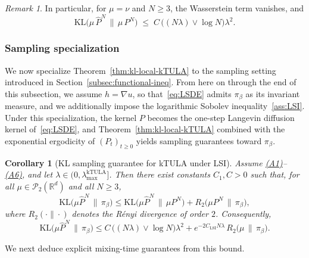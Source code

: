 \documentclass[11pt,a4paper,reqno]{amsart}
\theoremstyle{plain}
\newtheorem{corollary}{Corollary}
\theoremstyle{definition}
\theoremstyle{remark}
\newtheorem{remark}{Remark}
\newcommand{\R}{\mathbb{R}}
\newcommand{\KL}{\mathrm{KL}}
\begin{document}
\begin{remark}\label{rem:kl-kTULA-same-init}
In particular, for $\mu=\nu$ and $N\ge 3$, the Wasserstein term vanishes, and
\[
\KL\!\bigl(\mu\,\widehat P^{N}\,\big\|\,\mu\,P^{N}\bigr)
\;\le\;
C\,\bigl((N\lambda)\vee \log N\bigr)\lambda^2.
\]
\end{remark}


\subsubsection{Sampling specialization}
\label{subsubsec:ktula-sampling}

We now specialize Theorem~\ref{thm:kl-local-kTULA} to the sampling setting introduced in Section~\ref{subsec:functional-ineq}. From here on through the end of this subsection, we assume $h = \nabla u$, so that~\eqref{eq:LSDE} admits $\pi_\beta$ as its invariant measure, and we additionally impose the logarithmic Sobolev inequality~\ref{ass:LSI}. Under this specialization, the kernel $P$ becomes the one-step Langevin diffusion kernel of~\eqref{eq:LSDE}, and Theorem~\ref{thm:kl-local-kTULA} combined with the exponential ergodicity of $(P_t)_{t\ge 0}$ yields sampling guarantees toward $\pi_\beta$.

\begin{corollary}[KL sampling guarantee for kTULA under LSI]
\label{prop:kl-sampling-ktula}
Assume \hyperref[ass:PJG]{\textup{(A1)}}--\hyperref[ass:LSI]{\textup{(A6)}}, and let $\lambda\in(0,\lambda_{\max}^{\mathrm{kTULA}}]$.
Then there exist constants $C_1,C>0$ such that, for all $\mu\in\mathcal P_2(\R^d)$ and all $N\ge3$,
\begin{equation}\label{eq:kl-ktula-to-pi-general}
\KL\!\bigl(\mu\widehat P^N\,\big\|\,\pi_\beta\bigr)
\le
\KL\!\bigl(\mu\widehat P^N\,\big\|\,\mu P^N\bigr)
+
R_2\!\bigl(\mu P^N\,\big\|\,\pi_\beta\bigr),
\end{equation}
where $R_2(\cdot\|\cdot)$ denotes the R\'enyi divergence of order $2$. Consequently,
\begin{equation}\label{eq:kl-ktula-to-pi-sameinit}
\KL\!\bigl(\mu\widehat P^N\,\big\|\,\pi_\beta\bigr)
\le
C\,\bigl((N\lambda)\vee\log N\bigr)\lambda^2
+
e^{-2C_{\mathrm{LSI}}N\lambda}\,R_2\!\bigl(\mu\,\big\|\,\pi_\beta\bigr).
\end{equation}
\end{corollary}

\medskip
\noindent
We next deduce explicit mixing-time guarantees from this bound.
\end{document}
